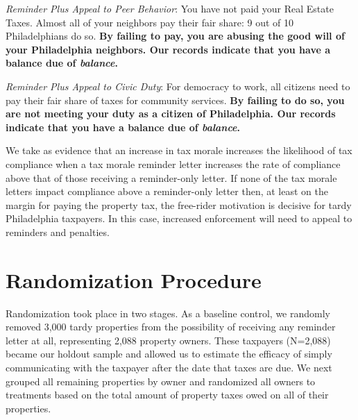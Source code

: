 \documentclass[12pt]{article}
\begin{document}
\noindent \textit{Reminder Plus Appeal to Peer Behavior}: You have not
paid your Real Estate Taxes.  Almost all of your neighbors pay their
fair share: 9 out of 10 Philadelphians do so.  \textbf{By failing to
  pay, you are abusing the good will of your Philadelphia neighbors.
  Our records indicate that you have a balance due of
  \textit{balance}.}

\bigskip

\noindent \textit{Reminder Plus Appeal to Civic Duty}: For democracy
to work, all citizens need to pay their fair share of taxes for
community services.  \textbf{By failing to do so, you are not meeting
  your duty as a citizen of Philadelphia.  Our records indicate that
  you have a balance due of \textit{balance}.}

\bigskip

We take as evidence that an increase in tax morale increases the
likelihood of tax compliance when a tax morale reminder letter
increases the rate of compliance above that of those receiving a
reminder-only letter.  If none of the tax morale letters impact
compliance above a reminder-only letter then, at least on the margin
for paying the property tax, the free-rider motivation is decisive for
tardy Philadelphia taxpayers.  In this case, increased enforcement
will need to appeal to reminders and penalties.


\section{Randomization Procedure}

Randomization took place in two stages.  As a baseline control, we
randomly removed 3,000 tardy properties from the possibility of
receiving any reminder letter at all, representing 2,088 property
owners.  These taxpayers (N=2,088) became our holdout sample and
allowed us to estimate the efficacy of simply communicating with the
taxpayer after the date that taxes are due. We next grouped all
remaining properties by owner and randomized all owners to treatments
based on the total amount of property taxes owed on all of their
properties.
\end{document}
